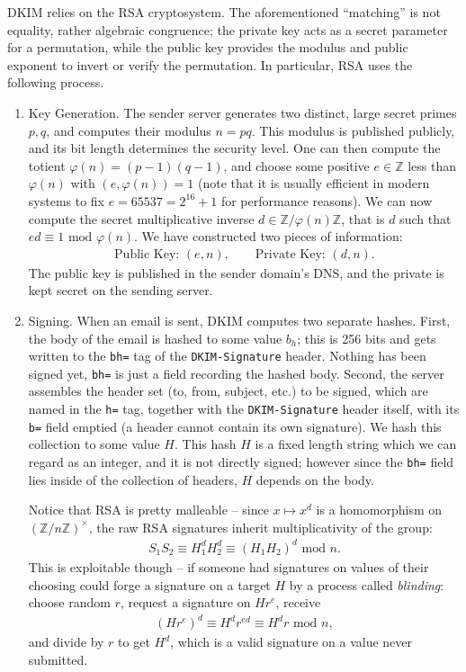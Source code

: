 \documentclass[12pt,reqno]{amsart}
\theoremstyle{definition}
\newcommand{\bbZ}{{\mathbb{Z}}}
\renewcommand{\mod}{\text{ mod }}
\let\temp\phi
\let\phi\varphi
\let\varphi\temp
\begin{document}
DKIM relies on the RSA cryptosystem. The aforementioned ``matching'' is not equality, rather algebraic congruence; the private key acts as a secret parameter for a permutation, while the public key provides the modulus and public exponent to invert or verify the permutation. In particular, RSA uses the following process.

\begin{enumerate}[label=\arabic*.]
    \item Key Generation. The sender server generates two distinct, large secret primes $p,q$, and computes their modulus $n=pq$. This modulus is published publicly, and its bit length determines the security level. One can then compute the totient $\phi(n)=(p-1)(q-1)$, and choose some positive $e\in\bbZ$ less than $\phi(n)$ with $(e,\phi(n))=1$ (note that it is usually efficient in modern systems to fix $e=65537=2^{16}+1$ for performance reasons). We can now compute the secret multiplicative inverse $d\in \bbZ/\phi(n)\bbZ$, that is $d$ such that $ed\equiv 1 \mod \phi(n)$. We have constructed two pieces of information:
    \begin{align*}
        \text{Public Key: }(e,n),\qquad\text{Private Key: }(d,n).
    \end{align*} The public key is published in the sender domain's DNS, and the private is kept secret on the sending server. 
    \item Signing. When an email is sent, DKIM computes two separate hashes. First, the body of the email is hashed to some value $b_h$; this is 256 bits and gets written to the \verb|bh=| tag of the \texttt{DKIM-Signature} header. Nothing has been signed yet, \verb|bh=| is just a field recording the hashed body. Second, the server assembles the header set (to, from, subject, etc.) to be signed, which are named in the \verb|h=| tag, together with the \texttt{DKIM-Signature} header itself, with its \verb|b=| field emptied (a header cannot contain its own signature). We hash this collection to some value $H$. This hash $H$ is a fixed length string which we can regard as an integer, and it is not directly signed; however since the \verb|bh=| field lies inside of the collection of headers, $H$ depends on the body.

    Notice that RSA is pretty malleable -- since $x\mapsto x^d$ is a homomorphism on $(\bbZ/n\bbZ)^\times$, the raw RSA signatures inherit multiplicativity of the group:
    \begin{align*}
        S_1S_2\equiv H_1^dH_2^d\equiv (H_1H_2)^d\mod n.
    \end{align*} This is exploitable though -- if someone had signatures on values of their choosing could forge a signature on a target $H$ by a process called \textit{blinding}: choose random $r$, request a signature on $Hr^e$, receive
    \begin{align*}
        (Hr^e)^d\equiv H^dr^{ed}\equiv H^dr\mod n,
    \end{align*} and divide by $r$ to get $H^d$, which is a valid signature on a value never submitted. 


\end{enumerate}
\end{document}
